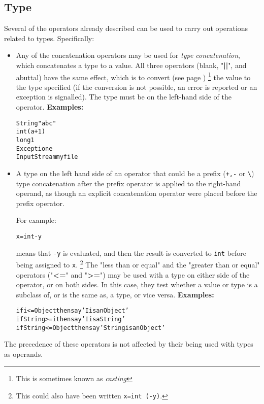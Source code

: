 \subsection{Type}\label{reftypeops}
Several of the operators already described can be used to carry out
operations related to types.  Specifically:
\begin{itemize}
\item Any of the concatenation operators may be used for \emph{type
concatenation}, which concatenates a type to a value.  All three
operators (blank, "\textbf{||}", and abuttal) have the same
effect, which is to  convert (see page \pageref{refconv}) 
\footnote{
This is sometimes known as \emph{casting}
}
the value to the type
specified (if the conversion is not possible, an error is reported or an
exception is signalled).
The type must be on the left-hand side of the operator.
 \textbf{Examples:}
\begin{alltt}
String "abc"
int (a+1)
long 1
Exception e
InputStream myfile
\end{alltt}
\item 
{}
A type on the left hand side of an operator that could be a prefix
(\texttt{+,-} or \texttt{\textbackslash})
type concatenation after the prefix operator is applied to the
right-hand operand, as though an explicit concatenation operator were
placed before the prefix operator.

For example:
\begin{alltt}
x=int -y
\end{alltt}
means that \texttt{-y} is evaluated, and then the result is
converted to \texttt{int} before being assigned to \texttt{x}.
\footnote{
This could also have been written \texttt{x=int (-y)}.
}
The "less than or equal" and the "greater than or equal"
operators ("\textbf{<=}" and "\textbf{>=}") may be used
with a type on either side of the operator, or on both sides.
In this case, they test whether a value or type is a subclass of, or is
the same as, a type, or vice versa.
 \textbf{Examples:}
\begin{alltt}
if i<=Object then say 'I is an Object'
if String>=i then say 'I is a String'
if String<=Object then say 'String is an Object'
\end{alltt}
\end{itemize}
The precedence of these operators is not affected by their being
used with types as operands.
